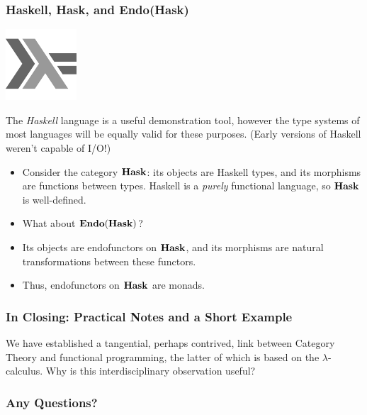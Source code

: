 \documentclass{beamer}
\numberwithin{figure}{section}
\DeclareMathOperator{\catendo}{\text{\textbf{Endo}}}
\DeclareMathOperator{\cathask}{\text{\textbf{Hask}}}
\begin{document}
\begin{frame}
        \frametitle{Haskell, \textbf{Hask}, and \textbf{Endo}(\textbf{Hask})}
        \begin{center}
                \begin{minipage}{.2\textwidth}
                        \includegraphics{hasklogo.pdf}
                \end{minipage}
                \begin{minipage}{.7\textwidth}
                        The \textit{Haskell} language is a useful demonstration
                        tool, however the type systems of most languages will be
                        equally valid for these purposes. (Early versions of
                        Haskell weren't capable of I/O!)
                \end{minipage}
        \end{center}
        \pause
        \begin{itemize}[<+->]
                \item Consider the category $\cathask$: its objects are Haskell
                        types, and its morphisms are functions between types.
                        Haskell is a \textit{purely} functional language, so
                        $\cathask$ is well-defined.
                \item What about $\catendo(\cathask)$?
                \item Its objects are endofunctors on $\cathask$, and its
                        morphisms are natural transformations between these
                        functors.
                \item Thus, endofunctors on $\cathask$ are monads.
        \end{itemize}
\end{frame}

\begin{frame}
        \frametitle{In Closing: Practical Notes and a Short Example}
        We have established a tangential, perhaps contrived, link between
        Category Theory and functional programming, the latter of which is 
        based on the $\lambda$-calculus. Why is this interdisciplinary
        observation useful?
\end{frame}

\begin{frame}
        \frametitle{Any Questions?}
\end{frame}
\end{document}
